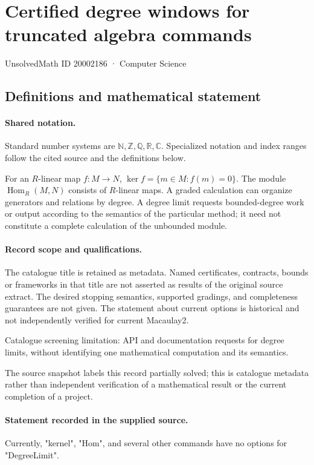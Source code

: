 \documentclass[11pt]{article}
\begin{document}
\setcounter{section}{20002185}
\section{Certified degree windows for truncated algebra commands}\label{20002186}
{\small\sffamily UnsolvedMath ID 20002186 · Computer Science}
\subsection{Definitions and mathematical statement}

\paragraph{Shared notation.}Standard number systems are $\mathbb N,\mathbb Z,\mathbb Q,\mathbb R,\mathbb C$. Specialized notation and index ranges follow the cited source and the definitions below.


For an $R$-linear map $f:M\to N$, $\ker f=\{m\in M:f(m)=0\}$. The module $\operatorname{Hom}_R(M,N)$ consists of $R$-linear maps. A graded calculation can organize generators and relations by degree. A degree limit requests bounded-degree work or output according to the semantics of the particular method; it need not constitute a complete calculation of the unbounded module.
\paragraph{Record scope and qualifications.}
The catalogue title is retained as metadata. Named certificates, contracts, bounds or frameworks in that title are not asserted as results of the original source extract.
The desired stopping semantics, supported gradings, and completeness guarantees are not given. The statement about current options is historical and not independently verified for current Macaulay2.

Catalogue screening limitation: API and documentation requests for degree limits, without identifying one mathematical computation and its semantics.

The source snapshot labels this record partially solved; this is catalogue metadata rather than independent verification of a mathematical result or the current completion of a project.
\paragraph{Statement recorded in the supplied source.}
Currently, "kernel", "Hom", and several other commands have no options for "DegreeLimit".
\end{document}
